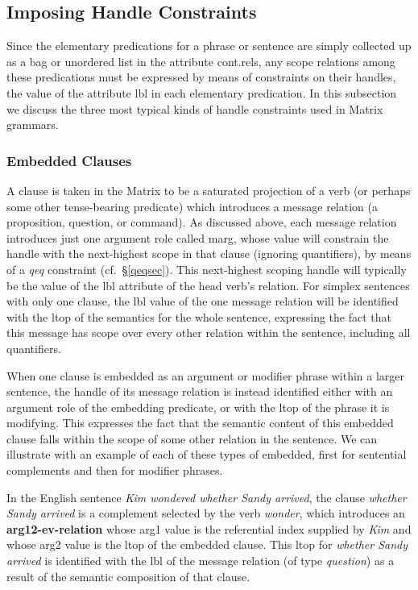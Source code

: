 \documentclass[12pt]{article}
\newcommand{\mpt}[1]{\marginpar{\tiny #1}}
\begin{document}
\subsection{Imposing Handle Constraints}
\label{hconssec}

Since the elementary predications for a phrase or sentence are simply 
collected up as a bag or unordered list in the attribute {\sc cont.rels},
any scope relations among these predications must be expressed by means of
constraints on their handles, the value of the attribute {\sc lbl} in each
elementary predication.  In this subsection we discuss the three most typical
kinds of handle constraints used in Matrix grammars.

\subsubsection{Embedded Clauses}
\label{msgsec}

A clause is taken in the Matrix to be a saturated projection of a verb (or\mpt{Update this section}
perhaps some other tense-bearing predicate) which introduces a message
relation (a proposition, question, or command).  As discussed above, each
message relation introduces just one argument role called {\sc marg}, whose
value will constrain the handle with the next-highest scope in that clause
(ignoring quantifiers), by means of a {\it qeq} constraint 
(cf.\ \S\ref{qeqsec}). 
This next-highest scoping handle will typically be the value of the {\sc lbl}
attribute of the head verb's relation.  For simplex sentences with only one
clause, the {\sc lbl} value of the one message relation will be identified
with the {\sc ltop} of the semantics for the whole sentence, expressing the
fact that this message has scope over every other relation within the
sentence, including all quantifiers.

When one clause is embedded as an argument or modifier phrase within a larger
sentence, the handle of its message relation is instead identified either with 
an argument role of the embedding predicate, or with the {\sc ltop} of the
phrase it is modifying.  This expresses the fact that the semantic content
of this embedded clause falls within the scope of some other relation in the
sentence.  We can illustrate with an example of each of these types of
embedded, first for sentential complements and then for modifier phrases.

In the English sentence {\it Kim wondered whether Sandy arrived}, the clause
{\it whether Sandy arrived} is a complement selected by the verb {\it wonder},
which introduces an {\bf arg12-ev-relation} whose {\sc arg1} value is the
referential index supplied by {\it Kim} and whose {\sc arg2} value is the
{\sc ltop} of the embedded clause.  This {\sc ltop} for {\it whether Sandy
arrived} is identified with the {\sc lbl} of the message relation (of type
{\it question}) as a result of the semantic composition of that clause.
\end{document}
